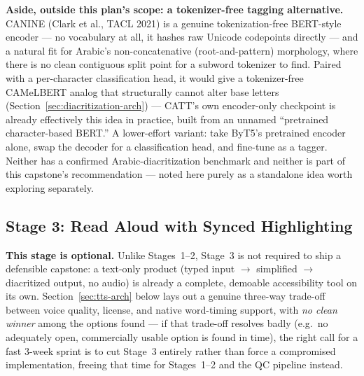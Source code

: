 \documentclass[11pt,a4paper]{article}
\begin{document}
\begin{noteb}
\textbf{Aside, outside this plan's scope: a tokenizer-free tagging
alternative.} CANINE (Clark et al., TACL 2021) is a genuine tokenization-free
BERT-style encoder --- no vocabulary at all, it hashes raw Unicode codepoints
directly --- and a natural fit for Arabic's non-concatenative
(root-and-pattern) morphology, where there is no clean contiguous split point
for a subword tokenizer to find. Paired with a per-character classification
head, it would give a tokenizer-free CAMeLBERT analog that structurally
cannot alter base letters (Section~\ref{sec:diacritization-arch}) --- CATT's
own encoder-only checkpoint is already effectively this idea in practice,
built from an unnamed ``pretrained character-based BERT.'' A lower-effort
variant: take ByT5's pretrained encoder alone, swap the decoder for a
classification head, and fine-tune as a tagger. Neither has a confirmed
Arabic-diacritization benchmark and neither is part of this capstone's
recommendation --- noted here purely as a standalone idea worth exploring
separately.
\end{noteb}

\subsection{Stage 3: Read Aloud with Synced Highlighting}
\label{sec:tts}

\begin{noteb}
\textbf{This stage is optional.} Unlike Stages~1--2, Stage~3 is not required
to ship a defensible capstone: a text-only product (typed input
$\to$ simplified $\to$ diacritized output, no audio) is already a complete,
demoable accessibility tool on its own. Section~\ref{sec:tts-arch} below lays
out a genuine three-way trade-off between voice quality, license, and native
word-timing support, with \emph{no clean winner} among the options found ---
if that trade-off resolves badly (e.g.\ no adequately open, commercially
usable option is found in time), the right call for a fast 3-week sprint is
to cut Stage~3 entirely rather than force a compromised implementation,
freeing that time for Stages~1--2 and the QC pipeline instead.
\end{noteb}
\end{document}
